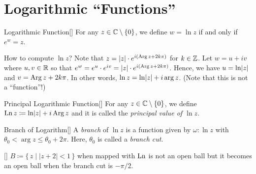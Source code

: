 \documentclass[../complex_variables_1.tex]{subfiles}
\begin{document}
\section{Logarithmic ``Functions''}

\begin{Definition}{Logarithmic Function}[]
    For any \(z \in \CC \setminus \{0\}\),
    we define \(w = \ln z\) if and only if \(e^w = z\).
\end{Definition}

\begin{note}
    How to compute \(\ln z\)?
    Note that \(z = \lvert z\rvert \cdot e^{i(\operatorname{Arg} z + 2k\pi)}\)
    for \(k \in \ZZ\).
    Let \(w = u + iv\) where \(u, v \in \RR\)
    so that \(e^w = e^u \cdot e^{iv} = \lvert z\rvert \cdot e^{i(\operatorname{Arg} z + 2k\pi)}\).
    Hence, we have \(u = \ln\lvert z\rvert\) and \(v = \operatorname{Arg} z + 2k\pi\).
    In other words, \(\ln z = \ln\lvert z\rvert + i\arg z\). (Note that this is not a ``function''!)
\end{note}


\begin{Definition}{Principal Logarithmic Function}[]
    For any \(z \in \CC \setminus \{0\}\),
    we define \(\operatorname{Ln} z \coloneqq \ln\lvert z\rvert + i \operatorname{Arg} z\)
    and it is called the \emph{principal value of \(\ln z\)}.
\end{Definition}

\begin{Definition}{Branch of Logarithm}[]
    A \emph{branch} of \(\ln z\) is a function given by
    \(\omega \colon \ln z\) with \(\theta_0 < \arg z \le \theta_0 + 2\pi\).
    Here, \(\theta_0\) is called a \emph{branch cut}.
\end{Definition}

\begin{Example}{}[]
    \(B \coloneqq \{\,z \mid |z+2| < 1\,\}\) when mapped with
    \(\operatorname{Ln}\) is not an open ball but it becomes an open ball when
    the branch cut is \(-\pi/2\).
\end{Example}
\end{document}
